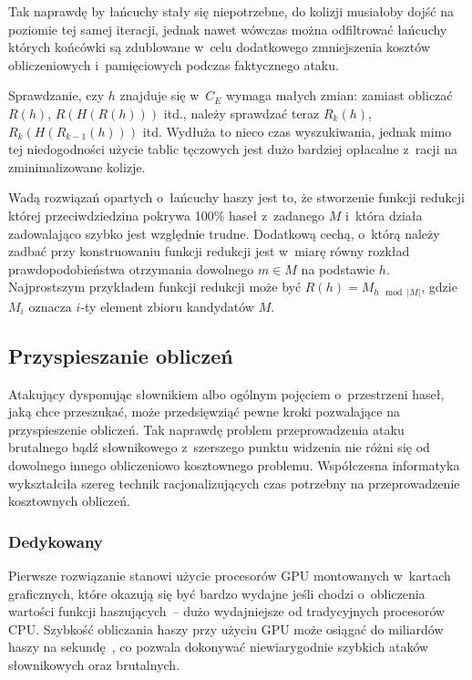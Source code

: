 Tak naprawdę by łańcuchy stały się niepotrzebne, do kolizji musiałoby dojść
na poziomie tej samej iteracji, jednak nawet wówczas można odfiltrować łańcuchy
których końcówki są zdublowane w~celu dodatkowego zmniejszenia kosztów
obliczeniowych i~pamięciowych podczas faktycznego ataku.

Sprawdzanie, czy $h$ znajduje się w~$C_E$ wymaga małych zmian: zamiast obliczać
$R(h)$, $R(H(R(h)))$ itd., należy sprawdzać teraz $R_k(h)$, $R_k(H(R_{k-1}(h)))$
itd. Wydłuża to nieco czas wyszukiwania, jednak mimo tej niedogodności użycie
tablic tęczowych jest dużo bardziej opłacalne z~racji na zminimalizowane
kolizje.

Wadą rozwiązań opartych o~łańcuchy haszy jest to, że stworzenie funkcji
redukcji której przeciwdziedzina pokrywa 100\% haseł z~zadanego $M$ i~która
działa zadowalająco szybko jest względnie trudne. Dodatkową cechą, o~którą
należy zadbać przy konstruowaniu funkcji redukcji jest w~miarę równy rozkład
prawdopodobieństwa otrzymania dowolnego $m \in M$ na podstawie $h$.
Najprostszym przykładem funkcji redukcji może być $R(h) = M_{h \mod |M|}$,
gdzie $M_i$ oznacza $i$-ty element zbioru kandydatów $M$.



\subsection{Przyspieszanie obliczeń}
Atakujący dysponując słownikiem albo ogólnym pojęciem o~przestrzeni haseł, jaką
chce przeszukać, może przedsięwziąć pewne kroki pozwalające na przyspieszenie
obliczeń. Tak naprawdę problem przeprowadzenia ataku brutalnego bądź
słownikowego z~szerszego punktu widzenia nie różni się od dowolnego innego
obliczeniowo kosztownego problemu. Współczesna informatyka wykształciła szereg
technik racjonalizujących czas potrzebny na przeprowadzenie kosztownych
obliczeń.



\subsubsection{Dedykowany }

Pierwsze rozwiązanie stanowi użycie procesorów GPU montowanych w~kartach
graficznych, które okazują się być bardzo wydajne jeśli chodzi o~obliczenia
wartości funkcji haszujących~-- dużo wydajniejsze od tradycyjnych procesorów
CPU. Szybkość obliczania haszy przy użyciu GPU może osiągać do miliardów
haszy na sekundę~\cite{gpu_cracking_benchmarks}, co pozwala dokonywać
niewiarygodnie szybkich ataków słownikowych oraz brutalnych.

